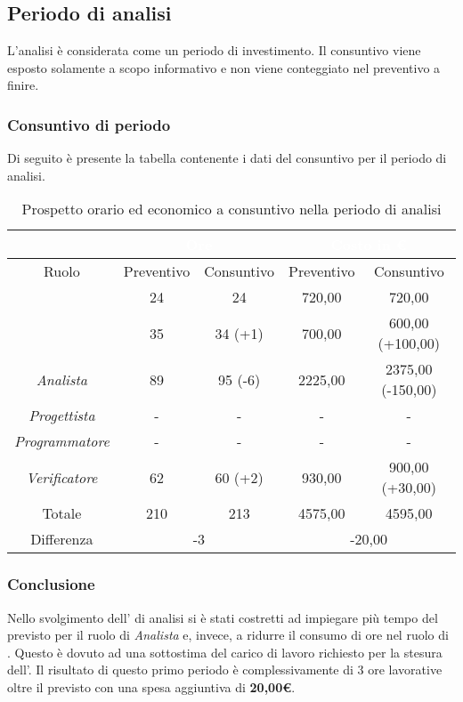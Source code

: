 \subsection{Periodo di analisi}
L'analisi è considerata come un periodo di investimento. Il consuntivo viene esposto solamente a scopo informativo e non viene conteggiato nel preventivo a finire.
\subsubsection{Consuntivo di periodo}
Di seguito è presente la tabella contenente i dati del consuntivo per il periodo di analisi.
\begin{table}[H]
	\centering
	\begin{tabular}{|c|c|c|c|c|}
		\rowcolor{darkblue} 
		&\multicolumn{2}{c|}{\textcolor{white}{Ore}}&\multicolumn{2}{c|}{\textcolor{white}{Costo in €}}\\ \hline
		Ruolo				&	Preventivo			&	Consuntivo		&	Preventivo	&	Consuntivo\\ \hline
		{\Responsabile}		&	24					&	24				&	720,00		&	720,00 \\ \hline
		{\Amministratore}	&	35					&	34 (+1)			&	700,00		&	600,00 (+100,00) \\ \hline
		\textit{Analista}	&	89					&	95 (-6)			&	2225,00		&	2375,00 (-150,00) \\ \hline
		\textit{Progettista}& 	-					&	- 				& 	-			&  	- \\ \hline
		\textit{Programmatore}& -					& 	-				& 	-			&  	- \\ \hline
		\textit{Verificatore}&	62					&	60 (+2)			&	930,00		&	900,00 (+30,00) \\ \hline
		Totale				&	210					&	213				&	4575,00		&	4595,00 \\ \hline
		Differenza			& 	\multicolumn{2}{c|}{-3} 				& \multicolumn{2}{c|}{-20,00}\\ \hline
	\end{tabular}
	\caption{Prospetto orario ed economico a consuntivo nella periodo di analisi}
\end{table}
\subsubsection{Conclusione}
Nello svolgimento dell' di analisi si è stati costretti ad impiegare più tempo del previsto per il ruolo di \textit{Analista} e, invece, a ridurre il consumo di ore nel ruolo di {\Amministratore}. Questo è dovuto ad una sottostima del carico di lavoro richiesto per la stesura dell'. Il risultato di questo primo periodo è complessivamente di 3 ore lavorative oltre il previsto con una spesa aggiuntiva di \textbf{20,00€}.\\
